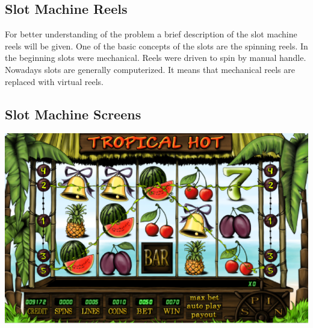 \documentclass[a0,portrait,25pt]{sciposter}
\begin{document}
\begin{multicols}{3}

\begin{mdframed}[backgroundcolor=white,roundcorner=4pt,shadow=true,linewidth=1pt]
\color{Black}
\section*{Slot Machine Reels}
For better understanding of the problem a brief description of the slot machine reels will be given. One of the basic concepts of the slots are the spinning reels. In the beginning slots were mechanical. Reels were driven to spin by manual handle. Nowadays slots are generally computerized. It means that mechanical reels are replaced with virtual reels. 
\end{mdframed}

\begin{mdframed}[backgroundcolor=white,roundcorner=4pt,shadow=true,linewidth=1pt]
\section*{Slot Machine Screens}
\begin{minipage}[c]{1\linewidth}
\includegraphics[width=0.9\linewidth]{pic003} \\


\end{minipage}
\end{mdframed}
\end{multicols}
\end{document}
